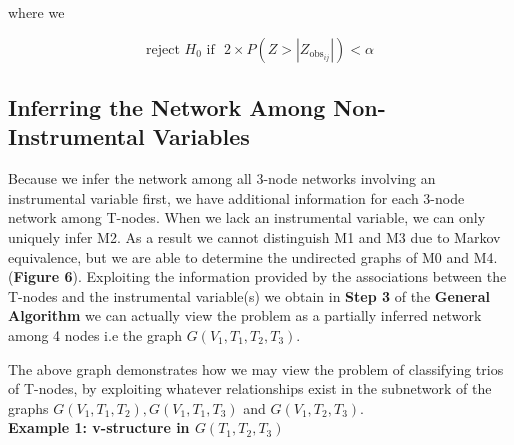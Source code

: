 \documentclass[12pt]{report}
\begin{document}
where we 

\[ \text{reject $H_0$ if} \ \ \ 2\times P(Z >  |Z_{\text{obs}_{ij}}|) < \alpha \]

\subsection*{Inferring the Network Among Non-Instrumental Variables}

Because we infer the network among all 3-node networks involving an instrumental variable first, we have additional information for each 3-node network among T-nodes. When we lack an instrumental variable, we can only uniquely infer M2. As a result we cannot distinguish M1 and M3 due to Markov equivalence, but we are able to determine the undirected graphs of M0 and M4. (\textbf{Figure 6}). Exploiting the information provided by the associations between the T-nodes and the instrumental variable(s) we obtain in \textbf{Step 3} of the \textbf{General Algorithm} we can actually view the problem as a partially inferred network among 4 nodes i.e the graph $G(V_1, T_1, T_2, T_3)$.\\


\begin{center}
\end{center}
The above graph demonstrates how we may view the problem of classifying trios of T-nodes, by exploiting whatever relationships exist in the subnetwork of the  graphs $G(V_1, T_1,T_2), G(V_1,T_1,T_3)$ and $G(V_1, T_2,T_3)$. 
\\


\textbf{Example 1:  v-structure in $G(T_1, T_2, T_3)$}
\\

\begin{center}
\end{center}
\end{document}

